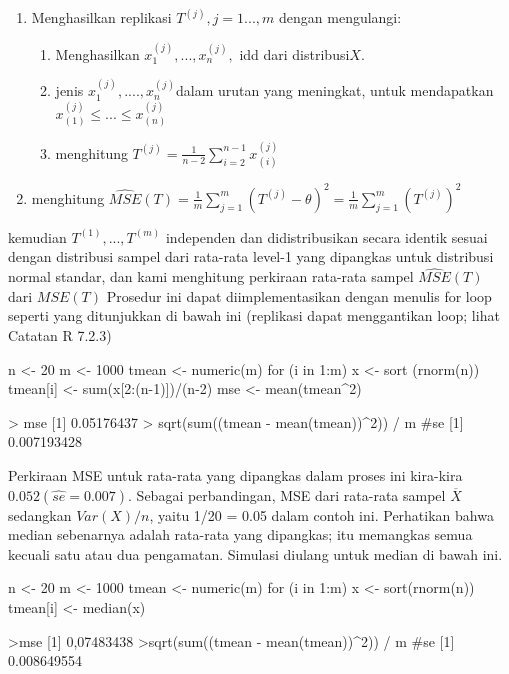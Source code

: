 \documentclass[a4paper,12pt]{article}
\theoremstyle{definition}
\begin{document}
\begin{enumerate}
    \item Menghasilkan replikasi $T^{(j)}, j=1...,m$ dengan mengulangi:
    \begin{enumerate}
        \item Menghasilkan $x^{(j)}_{1},...,x^{(j)}_{n},$ idd dari distribusi$X$.
        \item jenis $x^{(j)}_{1},....,x^{(j)}_{n}$dalam urutan yang meningkat, untuk mendapatkan $x^{(j)}_{(1)}\leq ...\leq x^{(j)}_{(n)}$
        \item menghitung $T^{(j)}=\frac{1}{n-2}\sum_{i=2}^{n-1}x^{(j)}_{(i)}$
    \end{enumerate}
    \item menghitung $\widehat{MSE}\left ( T \right )=\frac{1}{m}\sum_{j=1}^{m}(T^{(j)}-\theta )^{2}=\frac{1}{m}\sum_{j=1}^{m}(T^{(j)})^{2}$
\end{enumerate}
kemudian $T^{(1)},...,T^{(m)}$ independen dan didistribusikan secara identik sesuai dengan distribusi sampel dari rata-rata level-1 yang dipangkas untuk distribusi normal standar, dan kami menghitung perkiraan rata-rata sampel $\widehat{MSE}(T)$ dari $MSE(T)$ Prosedur ini dapat diimplementasikan dengan menulis for loop seperti yang ditunjukkan di bawah ini (replikasi dapat menggantikan loop; lihat Catatan R 7.2.3) 

\begin{spverbatim}
    n <- 20
    m <- 1000
    tmean <- numeric(m)
    for (i in 1:m) {
         x <- sort (rnorm(n))
         tmean[i] <- sum(x[2:(n-1)])/(n-2)
    }
    mse <- mean(tmean^2)

    > mse
    [1] 0.05176437
    > sqrt(sum((tmean - mean(tmean))^2)) / m #se
    [1] 0.007193428
\end{spverbatim}

Perkiraan MSE untuk rata-rata yang dipangkas dalam proses ini kira-kira $0.052 (\widehat{se}=0.007)$. Sebagai perbandingan, MSE dari rata-rata sampel $\overline{X}$ sedangkan $Var(X)/n$, yaitu 1/20 = 0.05 dalam contoh ini. Perhatikan bahwa median sebenarnya adalah rata-rata yang dipangkas; itu memangkas semua kecuali satu atau dua pengamatan. Simulasi diulang untuk median di bawah ini.

\begin{spverbatim}
    n <- 20
    m <- 1000
    tmean <- numeric(m)
    for (i in 1:m) {
         x <- sort(rnorm(n))
         tmean[i] <- median(x)
    }

    >mse
    [1] 0,07483438
    >sqrt(sum((tmean - mean(tmean))^2)) / m #se
    [1] 0.008649554
\end{spverbatim}
\end{document}

